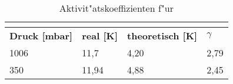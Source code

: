 	\begin{table}[H]
		\caption{Aktivit"atskoeffizienten f"ur }
		\label{tab: Aktivitätskoeffizient_CaCö2}
			\begin{tabular}{|l|l|l|l|}
			\hline
			\multicolumn{4}{|c|}{\textbf{\ce{CaCl2}}} \\\hline
			\textbf{Druck [mbar]}	 &	\textbf{real [K]}	&	\textbf{theoretisch [K]}	&	\textbf{$\gamma$} \\\hline
			1006	&	11,7		&	4,20	&	2,79 \\
			350		&	11,94		&	4,88	&	2,45 \\\hline
			\end{tabular}
	\end{table} 	
